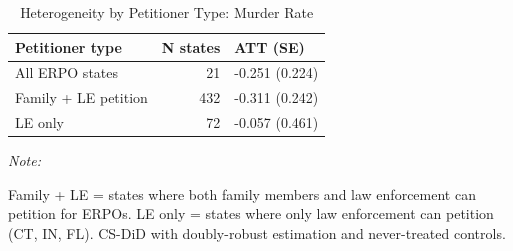 \begin{table}[!h]
\centering
\caption{\label{tab:tab:heterogeneity}Heterogeneity by Petitioner Type: Murder Rate}
\centering
\begin{threeparttable}
\begin{tabular}[t]{lrl}
\toprule
Petitioner type & N states & ATT (SE)\\
\midrule
All ERPO states & 21 & -0.251 (0.224)\\
Family + LE petition & 432 & -0.311 (0.242)\\
LE only & 72 & -0.057 (0.461)\\
\bottomrule
\end{tabular}
\begin{tablenotes}
\item \textit{Note: } 
\item Family + LE = states where both family members and law enforcement can petition for ERPOs. LE only = states where only law enforcement can petition (CT, IN, FL). CS-DiD with doubly-robust estimation and never-treated controls.
\end{tablenotes}
\end{threeparttable}
\end{table}
